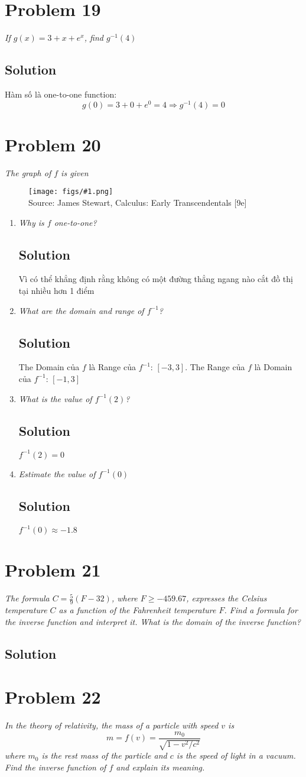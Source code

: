 \documentclass[11pt]{article}
\newcommand{\soln}{\subsection*}
\newcommand{\qn}{\textit}
\newcommand{\imagesource}[1]{{\footnotesize Source: #1}}
\newcommand{\imgqn}[1]{
	\begin{figure}[H]
		\centering
		\texttt{[image: figs/\#1.png]}\\
		\imagesource{James Stewart, Calculus: Early Transcendentals [9e]}
	\end{figure}
}
\begin{document}
\section*{Problem 19}

\qn{If $g(x)=3+x+e^x$, find $g^{-1}(4)$}

\soln{Solution}
Hàm số là one-to-one function: $$g(0)=3+0+e^0=4 \Rightarrow g^{-1}(4)=0$$

\section*{Problem 20}

\qn{The graph of $f$ is given}
\imgqn{1.5.20}
\begin{enumerate}
	\item \qn{Why is $f$ one-to-one?}
	\soln{Solution}
	Vì có thể khẳng định rằng không có một đường thẳng ngang nào cắt đồ thị tại nhiều hơn 1 điểm
	
	\item \qn{What are the domain and range of $f^{-1}$?}
	\soln{Solution}
	The Domain của $f$ là Range của $f^{-1}$: $[-3,3]$. The Range của $f$ là Domain của $f^{-1}$: $[-1, 3]$
	
	\item \qn{What is the value of $f^{-1}(2)$?}
	\soln{Solution}
	$f^{-1}(2)=0$
	
	\item \qn{Estimate the value of $f^{-1}(0)$}
	\soln{Solution}
	$f^{-1}(0) \approx -1.8$
\end{enumerate}

\section*{Problem 21}

\qn{The formula $C=\frac{5}{9}(F-32)$, where $F \ge -459.67$, expresses the Celsius temperature $C$ as a function of the Fahrenheit temperature $F$. Find a formula for the inverse function and interpret it. What is the domain of the inverse function?}

\soln{Solution}

\section*{Problem 22}

\qn{In the theory of relativity, the mass of a particle with speed $v$ is $$m=f(v)=\frac{m_0}{\sqrt{1-v^2/c^2}}$$ where $m_0$ is the rest mass of the particle and $c$ is the speed of light in a vacuum. Find the inverse function of $f$ and explain its meaning.}
\end{document}
